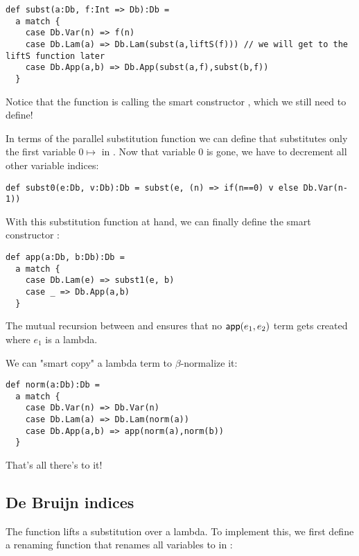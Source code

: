 \begin{minipage}{\textwidth}\begin{lstlisting}
def subst(a:Db, f:Int => Db):Db =
  a match {
    case Db.Var(n) => f(n)
    case Db.Lam(a) => Db.Lam(subst(a,liftS(f))) // we will get to the liftS function later
    case Db.App(a,b) => Db.App(subst(a,f),subst(b,f))
  }
\end{lstlisting}\end{minipage}

Notice that the  function is calling the smart constructor , which we still need to define!

In terms of the parallel substitution function  we can define  that substitutes only the first variable $0 \mapsto$  in .
Now that variable $0$ is gone, we have to decrement all other variable indices:

\begin{lstlisting}
def subst0(e:Db, v:Db):Db = subst(e, (n) => if(n==0) v else Db.Var(n-1))
\end{lstlisting}

With this substitution function at hand, we can finally define the smart constructor :

\begin{lstlisting}
def app(a:Db, b:Db):Db =
  a match {
    case Db.Lam(e) => subst1(e, b)
    case _ => Db.App(a,b)
  }
\end{lstlisting}

The mutual recursion between  and  ensures that no $\mathsf{app}(e_1,e_2)$ term gets created where $e_1$ is a lambda.

We can "smart copy" a lambda term to $\beta$-normalize it:

\begin{lstlisting}
def norm(a:Db):Db =
  a match {
    case Db.Var(n) => Db.Var(n)
    case Db.Lam(a) => Db.Lam(norm(a))
    case Db.App(a,b) => app(norm(a),norm(b))
  }
\end{lstlisting}

That's all there's to it!

\subsection{De Bruijn indices}

The  function lifts a substitution over a lambda.
To implement this, we first define a renaming function  that renames all variables  to  in :

